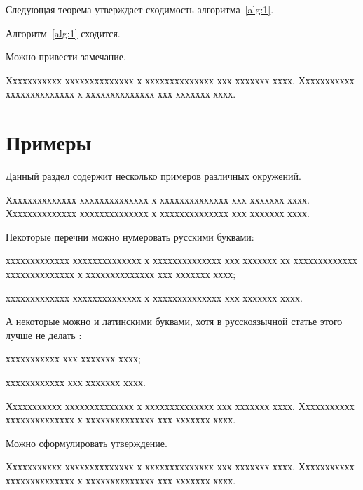 \documentclass[11pt]{ubs}
\begin{document}
Следующая теорема утверждает сходимость алгоритма~\ref{alg:1}.

\begin{theorem} \label{th:2}
Алгоритм~{\rm\ref{alg:1}} сходится.
\end{theorem}

Можно привести замечание.

\begin{remark}
Ххххххххххх хххххххххххххх х хххххххххххххх ххх ххххххх хххх.
Ххххххххххх хххххххххххххх х хххххххххххххх ххх ххххххх хххх.
\end{remark}

\section{Примеры}

Данный раздел содержит несколько примеров различных окружений.

\begin{example}
Хххххххххххххх хххххххххххххх х хххххххххххххх ххх ххххххх хххх.
Хххххххххххххх хххххххххххххх х хххххххххххххх ххх ххххххх хххх.

Некоторые перечни можно нумеровать русскими буквами:
\begin{ruslist} %
\item
ххххххххххххх хххххххххххххх х хххххххххххххх ххх ххххххх хх
ххххххххххххх хххххххххххххх х хххххххххххххх ххх ххххххх хххх;

\item
ххххххххххххх хххххххххххххх х хххххххххххххх ххх ххххххх хххх.
\end{ruslist}

А некоторые можно и латинскими буквами, хотя в русскоязычной статье этого лучше не делать :

\begin{latlist} %
\item
ххххххххххх ххх ххххххх хххх;
\item
хххххххххххх ххх ххххххх хххх.
\end{latlist}
Ххххххххххх хххххххххххххх х хххххххххххххх ххх ххххххх хххх.
Ххххххххххх хххххххххххххх х хххххххххххххх ххх ххххххх хххх.
\end{example}

Можно сформулировать утверждение.

\begin{statement}
Ххххххххххх хххххххххххххх х хххххххххххххх ххх ххххххх хххх.
Ххххххххххх хххххххххххххх х хххххххххххххх ххх ххххххх хххх.
\end{statement}
\end{document}
